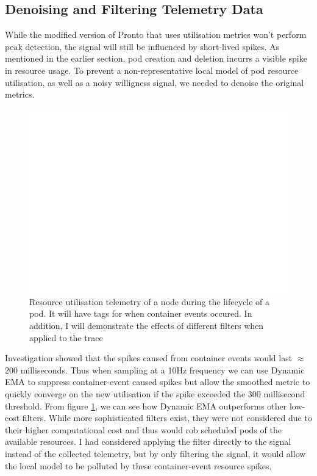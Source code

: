 \subsection{Denoising and Filtering Telemetry Data}
While the modified version of Pronto that uses utilisation metrics won't perform
peak detection, the signal will still be influenced by short-lived spikes. As
mentioned in the earlier section, pod creation and deletion incurrs a visible
spike in resource usage. To prevent a non-representative local model of pod
resource utilisation, as well as a noisy willigness signal, we needed to denoise
the original metrics.
\begin{figure}[h]
    \centering
    \includegraphics[width=\textwidth]{images/blank.pdf}
    \caption{Resource utilisation telemetry of a node during the lifecycle of a
    pod. It will have tags for when container events occured. In addition, I
    will demonstrate the effects of different filters when applied to the
    trace}
    \label{utilisation-noise}
\end{figure}
Investigation showed that the spikes caused from container events would last
$\approx$200 milliseconds. Thus when sampling at a 10Hz frequency we can use
Dynamic EMA to suppress container-event caused spikes but allow the smoothed
metric to quickly converge on the new utilisation if the spike exceeded the 300
millisecond threshold. From figure \ref{utilisation-noise}, we can see how
Dynamic EMA outperforms other low-cost filters. While more sophisticated filters
exist, they were not considered due to their higher computational cost and thus
would rob scheduled pods of the available resources. I had considered applying
the filter directly to the signal instead of the collected telemetry, but by
only filtering the signal, it would allow the local model to be polluted by
these container-event resource spikes.

